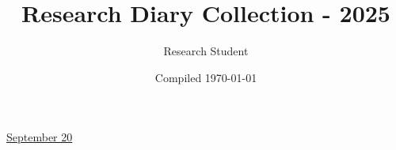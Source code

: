 \documentclass[letterpaper,11pt]{article}
\title{Research Diary Collection - 2025}
\author{Research Student}
\date{Compiled \today}
\begin{document}
\tableofcontents
\thispagestyle{empty}
\newpage


\href{run:2025-09-20-3.tex}{\Huge September 20} %

\section*{ }



\clearpage




\end{document}
